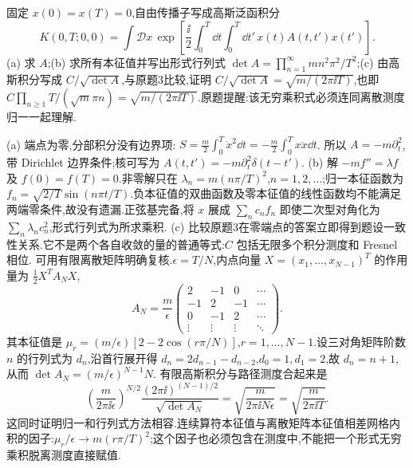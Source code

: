 \begin{exercise}
固定 $x(0)=x(T)=0$,自由传播子写成高斯泛函积分
\[
K(0,T;0,0)=\int\mathcal Dx\,\exp\left[\frac{\ii}{2}\int_0^T\dd t\int_0^T\dd t'\,x(t)A(t,t')x(t')\right].
\]
(a) 求 $A$;(b) 求所有本征值并写出形式行列式 $\det A=\prod_{n=1}^\infty mn^2\pi^2/T^2$;(c) 由高斯积分写成 $C/\sqrt{\det A}$,与原题3比较,证明 $C/\sqrt{\det A}=\sqrt{m/(2\pi\ii T)}$,也即 $C\prod_{n\ge1}T/(\sqrt m\pi n)=\sqrt{m/(2\pi\ii T)}$.原题提醒:该无穷乘积式必须连同离散测度归一一起理解.
\end{exercise}
\begin{solution}
(a) 端点为零,分部积分没有边界项:
$S=\tfrac m2\int_0^T\dot x^2\dd t=-\tfrac m2\int_0^Tx\ddot x\dd t$.
所以 $A=-m\partial_t^2$,带 Dirichlet 边界条件;核可写为 $A(t,t')=-m\partial_t^2\delta(t-t')$.
(b) 解 $-mf''=\lambda f$ 及 $f(0)=f(T)=0$.非零解只在 $\lambda_n=m(n\pi/T)^2$,$n=1,2,\ldots$;归一本征函数为 $f_n=\sqrt{2/T}\sin(n\pi t/T)$.负本征值的双曲函数及零本征值的线性函数均不能满足两端零条件,故没有遗漏.正弦基完备,将 $x$ 展成 $\sum_n c_nf_n$ 即使二次型对角化为 $\sum_n\lambda_nc_n^2$,形式行列式为所求乘积.
(c) 比较原题3在零端点的答案立即得到题设一致性关系.它不是两个各自收敛的量的普通等式:$C$ 包括无限多个积分测度和 Fresnel 相位.
可用有限离散矩阵明确复核.$\epsilon=T/N$,内点向量 $X=(x_1,\ldots,x_{N-1})^T$ 的作用量为 $\tfrac12X^TA_NX$,
\[
A_N=\frac m\epsilon\begin{pmatrix}2&-1&0&\cdots\\-1&2&-1&\cdots\\0&-1&2&\cdots\\\vdots&\vdots&\vdots&\ddots\end{pmatrix}.
\]
其本征值是 $\mu_r=(m/\epsilon)[2-2\cos(r\pi/N)]$,$r=1,\ldots,N-1$.设三对角矩阵阶数 $n$ 的行列式为 $d_n$,沿首行展开得 $d_n=2d_{n-1}-d_{n-2}$,$d_0=1,d_1=2$,故 $d_n=n+1$,从而 $\det A_N=(m/\epsilon)^{N-1}N$.
有限高斯积分与路径测度合起来是
\[
\left(\frac{m}{2\pi\ii\epsilon}\right)^{N/2}
\frac{(2\pi\ii)^{(N-1)/2}}{\sqrt{\det A_N}}
=\sqrt{\frac{m}{2\pi\ii N\epsilon}}=\sqrt{\frac{m}{2\pi\ii T}}.
\]
这同时证明归一和行列式方法相容.连续算符本征值与离散矩阵本征值相差网格内积的因子:$\mu_r/\epsilon\to m(r\pi/T)^2$;这个因子也必须包含在测度中,不能把一个形式无穷乘积脱离测度直接赋值.
\end{solution}
